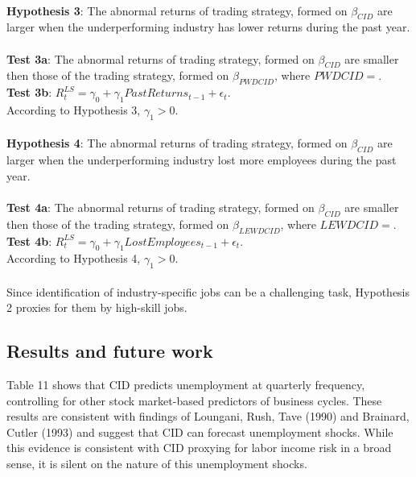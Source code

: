 \documentclass[12pt]{article}
\begin{document}
\paragraph{}
\textbf{Hypothesis 3}: The abnormal returns of trading strategy, formed on $\beta_{CID}$ are larger when the underperforming industry has lower returns during the past year.
\paragraph{}
\textbf{Test 3a}: The abnormal returns of trading strategy, formed on $\beta_{CID}$ are smaller then those of the trading strategy, formed on $\beta_{PWDCID}$, where $PWDCID=$.
\\ \-\hspace{0.3cm}
\textbf{Test 3b}: $R^{LS}_{t} = \gamma_0 +\gamma_1 PastReturns_{t-1}+\epsilon_t$. \\ 
According to Hypothesis 3, $\gamma_1>0$.
\paragraph{}
\textbf{Hypothesis 4}: The abnormal returns of trading strategy, formed on $\beta_{CID}$ are larger when the underperforming industry lost more employees during the past year.
\paragraph{}
\textbf{Test 4a}: The abnormal returns of trading strategy, formed on $\beta_{CID}$ are smaller then those of the trading strategy, formed on $\beta_{LEWDCID}$, where $LEWDCID=$.
\\ \-\hspace{0.3cm}
\textbf{Test 4b}: $R^{LS}_{t} = \gamma_0 +\gamma_1 LostEmployees_{t-1}+\epsilon_t$. \\ 
According to Hypothesis 4, $\gamma_1>0$.
\paragraph{}
Since identification of industry-specific jobs can be a challenging task, Hypothesis 2 proxies for them by high-skill jobs. 


\subsection{Results and future work}
Table 11 shows that CID predicts unemployment at quarterly frequency, controlling for other stock market-based predictors of business cycles. These results are consistent with findings of Loungani, Rush, Tave (1990) and Brainard, Cutler (1993) and suggest that CID can forecast unemployment shocks. While this evidence is consistent with CID proxying for labor income risk in a broad sense, it is silent on the nature of this unemployment shocks.
\end{document}
